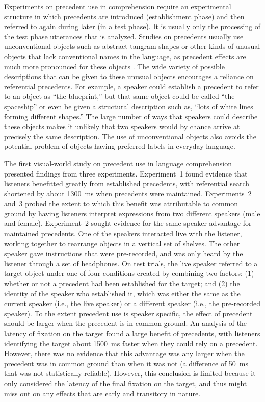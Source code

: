 \documentclass[doc,fignum,apacite,floatsintext]{apa6}
\begin{document}
Experiments on precedent use in comprehension require an experimental structure in which precedents are introduced (establishment phase) and then referred to again during later (in a test phase).  It is usually only the processing of the test phase utterances that is analyzed.  Studies on precedents usually use unconventional objects such as abstract tangram shapes or other kinds of unusual objects that lack conventional names in the language, as precedent effects are much more pronounced for these objects \cite{barrkeysar02}.  The wide variety of possible descriptions that can be given to these unusual objects encourages a reliance on referential precedents.  For example, a speaker could establish a precedent to refer to an object as ``the blueprint,'' but that same object could be called ``the spaceship'' or even be given a structural description such as, ``lots of white lines forming different shapes.''  The large number of ways that speakers could describe these objects makes it unlikely that two speakers would by chance arrive at precisely the same description.  The use of unconventional objects also avoids the potential problem of objects having preferred labels in everyday language.

The first visual-world study on precedent use in language comprehension \cite{barrkeysar02} presented findings from three experiments.  Experiment~1 found evidence that listeners benefitted greatly from established precedents, with referential search shortened by about 1300~ms when precedents were maintained.  Experiments~2 and~3 probed the extent to which this benefit was attributable to common ground by having listeners interpret expressions from two different speakers (male and female).  Experiment~2 sought evidence for the same speaker advantage for maintained precedents.  One of the speakers interacted live with the listener, working together to rearrange objects in a vertical set of shelves.  The other speaker gave instructions that were pre-recorded, and was only heard by the listener through a set of headphones.  On test trials, the live speaker referred to a target object under one of four conditions created by combining two factors: (1) whether or not a precedent had been established for the target; and (2) the identity of the speaker who established it, which was either the same as the current speaker (i.e., the live speaker) or a different speaker (i.e., the pre-recorded speaker).  To the extent precedent use is speaker specific, the effect of precedent should be larger when the precedent is in common ground.  An analysis of the latency of fixation on the target found a large benefit of precedents, with listeners identifying the target about 1500~ms faster when they could rely on a precedent.  However, there was no evidence that this advantage was any larger when the precedent was in common ground than when it was not (a difference of 50~ms that was not statistically reliable).  However, this conclusion is limited because it only considered the latency of the final fixation on the target, and thus might miss out on any effects that are early and transitory in nature.
\end{document}
